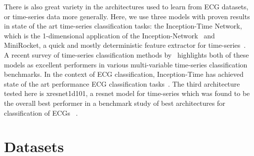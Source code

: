 \documentclass[pmlr,twocolumn]{jmlr}%
\begin{document}
There is also great variety in the architectures used to learn from ECG datasets, or time-series data more generally. Here, we use three models with proven results in state of the art time-series classification tasks: the Inception-Time Network, which is the 1-dimensional application of the Inception-Network~\cite{szegedy2017inception,ismail2020inceptiontime} and MiniRocket, a quick and mostly deterministic feature extractor for time-series~\cite{dempster2021minirocket}. A recent survey of time-series classification methods by~\cite{ruiz2021great} highlights both of these models as excellent performers in various multi-variable time-series classification benchmarks. In the context of ECG classification, Inception-Time has achieved state of the art performance ECG classification tasks~\cite{Strodthoff2021}. The third architecture tested here is xresnet1d101, a resnet model for time-series which was found to be the overall best performer in a benchmark study of best architectures for classification of ECGs~\cite{strodthoff2020deep} .

\section{Datasets}
\label{datasets}
\end{document}
